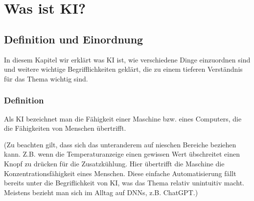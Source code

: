 \part{Was ist KI?}
\chapter{Definition und Einordnung}
In diesem Kapitel wir erklärt was \ac{KI} ist, 
wie verschiedene Dinge einzuordnen sind 
und weitere wichtige Begrifflichkeiten geklärt, 
die zu einem tieferen Verständnis für das Thema wichtig sind.

\section{Definition}
Als \ac{KI} bezeichnet man die Fähigkeit einer Maschine bzw. eines Computers, 
die die Fähigkeiten von Menschen übertrifft.

(Zu beachten gilt, dass sich das 
unteranderem auf nieschen Bereiche beziehen kann. Z.B. wenn die Temperaturanzeige 
einen gewissen Wert übschreitet einen Knopf zu drücken für die Zusatzkühlung. Hier 
übertrifft die Maschine die Konzentrationsfähigkeit eines Menschen. Diese einfache 
Automatisierung fällt bereits unter die Begriflichkeit von KI, was das Thema 
relativ unintuitiv macht. Meistens bezieht man sich im Alltag auf DNNs, z.B. 
ChatGPT.)

